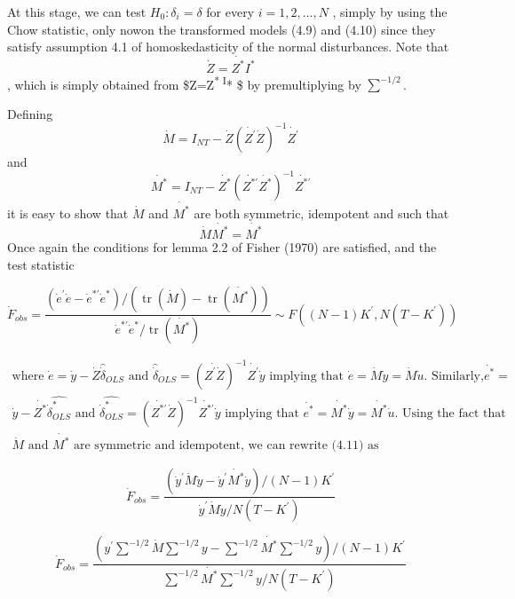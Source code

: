 \documentclass[
]{book}
\begin{document}
At this stage, we can test \(H_0:\delta_i =\delta\) for every \(i=1,2,\ldots, N\) , simply by using the Chow statistic, only nowon the transformed models (4.9) and (4.10) since they satisfy assumption 4.1
of homoskedasticity of the normal disturbances. Note that \[\dot{Z}=\dot{Z^*}I^* \] , which is simply obtained
from \$Z=Z\textsuperscript{* I}* \$ by premultiplying by \(\sum^{-1/2}\).

Defining \[\dot{M}=I_{NT}-\dot{Z}\left(\dot{Z^{\prime}}\dot{Z} \right)^{-1} \dot{Z^{\prime}}   \] and \[\dot{M^*}=I_{NT}-\dot{Z^*}\left(\dot{Z^{* \prime}}\dot{Z^*} \right)^{-1} \dot{Z^{* \prime}}   \] it is easy to show that \(\dot{M}\) and \(\dot{M^*}\) are both symmetric, idempotent and such that \[\dot{M} \dot{M^*}=\dot{M^*}  \] Once again the conditions for lemma 2.2 of Fisher (1970) are satisfied, and the test statistic

\begin{equation}
\dot{F}_{obs}=\frac{\left(\dot{e}^{\prime} \dot{e}-\dot{e}^{* \prime}    \dot{e}^* \right)  /  \left(\operatorname{tr}\left(\dot{M}\right)-\operatorname{tr}\left(\dot{M^*}  \right) \right)  } 
{\dot{e}^{* \prime}    \dot{e}^* / \operatorname{tr}\left( \dot{M^*} \right) } 
\sim
F \left(\left( N-1 \right)K^{\prime} , N \left( T- K^{\prime} \right)          \right)
\end{equation}

\[
\begin{aligned}
\text{where  } \dot{e}=\dot{y}-\dot{Z} \widehat{\dot{\delta}}_{OLS}  
 \text{ and } \widehat{\dot{\delta}}_{OLS} =\left(\dot{Z^{\prime}\dot{Z}} \right)^{-1} \dot{Z^{\prime}} \dot{y}  \text{ implying that } \dot{e}=\dot{M}\dot{y}=\dot{M}\dot{u} \text{.   Similarly,}   \dot{e^*}= \\ \dot{y}-\dot{Z^*}\widehat{\dot{\delta}_{OLS}^*} \text{ and } \widehat{\dot{\delta}_{OLS}^*}=\left(\dot{Z^{* \prime}} \dot{Z} \right)^{-1} \dot{Z^{* \prime}} \dot{y} \text{ implying that }  \dot{e^*}=\dot{M^*}\dot{y}= \dot{M^*} \dot{u} \text{. Using the fact that } \\ \dot{M} \text{ and } \dot{M^*} \text{ are symmetric and idempotent, we can rewrite (4.11) as } 
 \end{aligned}
 \]

\[
\dot{F}_{obs}=  \frac{\left(\dot{y}^{\prime}\dot{M}\dot{y}-\dot{y}^{\prime}\dot{M^*} \dot{y} \right) / \left(N-1\right) K^{\prime} } 
 {\dot{y}^{\prime}\dot{M}\dot{y} / N \left( T-K^{\prime} \right)    }\]

\begin{equation}
 \dot{F}_{obs}=\frac{   \left(y^{\prime} \sum^{-1/2}\dot{M} \sum^{-1/2}y -\sum^{-1/2}\dot{M^*} \sum^{-1/2}y \right) / \left(N-1\right) K^{\prime}  }
{ \sum^{-1/2}\dot{M^*} \sum^{-1/2}y  / N \left(T-K^{\prime} \right)  }
\end{equation}
\end{document}
